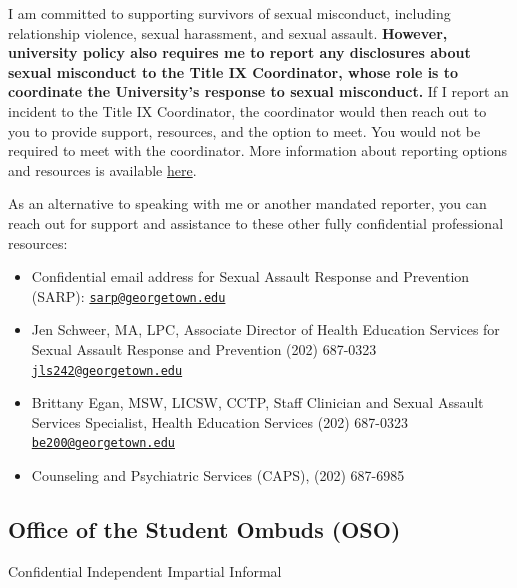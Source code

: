 \documentclass[
  letterpaper,
  DIV=11,
  numbers=noendperiod]{scrartcl}
\providecommand{\tightlist}{%
  \setlength{\itemsep}{0pt}\setlength{\parskip}{0pt}}
\begin{document}
I am committed to supporting survivors of sexual misconduct, including
relationship violence, sexual harassment, and sexual assault.
\textbf{However, university policy also requires me to report any
disclosures about sexual misconduct to the Title IX Coordinator, whose
role is to coordinate the University's response to sexual misconduct.}
If I report an incident to the Title IX Coordinator, the coordinator
would then reach out to you to provide support, resources, and the
option to meet. You would not be required to meet with the coordinator.
More information about reporting options and resources is available
\href{https://sexualassault.georgetown.edu/\#_ga=2.84763163.302405512.1597672771-114879328.1580830596}{here}.

As an alternative to speaking with me or another mandated reporter, you
can reach out for support and assistance to these other fully
confidential professional resources:

\begin{itemize}
\tightlist
\item
  Confidential email address for Sexual Assault Response and Prevention
  (SARP):
  \href{mailto:sarp@georgetown.edu}{\nolinkurl{sarp@georgetown.edu}}\\
\item
  Jen Schweer, MA, LPC, Associate Director of Health Education Services
  for Sexual Assault Response and Prevention (202) 687-0323 \textbar{}
  \href{mailto:jls242@georgetown.edu}{\nolinkurl{jls242@georgetown.edu}}\\
\item
  Brittany Egan, MSW, LICSW, CCTP, Staff Clinician and Sexual Assault
  Services Specialist, Health Education Services (202) 687-0323
  \textbar{}
  \href{mailto:be200@georgetown.edu}{\nolinkurl{be200@georgetown.edu}}\\
\item
  Counseling and Psychiatric Services (CAPS), (202) 687-6985
\end{itemize}

\subsection{\texorpdfstring{\textbf{Office of the Student Ombuds
(OSO)}}{Office of the Student Ombuds (OSO)}}\label{office-of-the-student-ombuds-oso}

Confidential \textbar{} Independent \textbar{} Impartial \textbar{}
Informal
\end{document}
